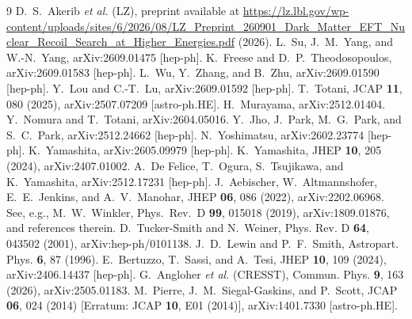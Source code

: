 \documentclass[aps,prl,twocolumn,superscriptaddress,nofootinbib]{revtex4-2}
\begin{document}

\begin{thebibliography}{9}
 D.~S.~Akerib \textit{et al.} (LZ), preprint available at \url{https://lz.lbl.gov/wp-content/uploads/sites/6/2026/08/LZ_Preprint_260901_Dark_Matter_EFT_Nuclear_Recoil_Search_at_Higher_Energies.pdf} (2026).
 L.~Su, J.~M.~Yang, and W.-N.~Yang, arXiv:2609.01475 [hep-ph].
 K.~Freese and D.~P.~Theodosopoulos, arXiv:2609.01583 [hep-ph].
 L.~Wu, Y.~Zhang, and B.~Zhu, arXiv:2609.01590 [hep-ph].
 Y.~Lou and C.-T.~Lu, arXiv:2609.01592 [hep-ph].
 T.~Totani, JCAP \textbf{11}, 080 (2025), arXiv:2507.07209 [astro-ph.HE].
 H.~Murayama, arXiv:2512.01404.
 Y.~Nomura and T.~Totani, arXiv:2604.05016.
 Y.~Jho, J.~Park, M.~G.~Park, and S.~C.~Park, arXiv:2512.24662 [hep-ph].
 N.~Yoshimatsu, arXiv:2602.23774 [hep-ph].
 K.~Yamashita, arXiv:2605.09979 [hep-ph].
 K.~Yamashita, JHEP \textbf{10}, 205 (2024), arXiv:2407.01002.
 A.~De Felice, T.~Ogura, S.~Tsujikawa, and K.~Yamashita, arXiv:2512.17231 [hep-ph].
 J.~Aebischer, W.~Altmannshofer, E.~E.~Jenkins, and A.~V.~Manohar, JHEP \textbf{06}, 086 (2022), arXiv:2202.06968.
 See, e.g., M.~W.~Winkler, Phys.~Rev.~D \textbf{99}, 015018 (2019), arXiv:1809.01876, and references therein.
 D.~Tucker-Smith and N.~Weiner, Phys. Rev. D \textbf{64}, 043502 (2001), arXiv:hep-ph/0101138.
 J.~D.~Lewin and P.~F.~Smith, Astropart. Phys. \textbf{6}, 87 (1996).
 E.~Bertuzzo, T.~Sassi, and A.~Tesi, JHEP \textbf{10}, 109 (2024), arXiv:2406.14437 [hep-ph].
 G.~Angloher \textit{et al.} (CRESST), Commun. Phys. \textbf{9}, 163 (2026), arXiv:2505.01183.
 M.~Pierre, J.~M.~Siegal-Gaskins, and P.~Scott, JCAP \textbf{06}, 024 (2014) [Erratum: JCAP \textbf{10}, E01 (2014)], arXiv:1401.7330 [astro-ph.HE].
\end{thebibliography}
\end{document}
